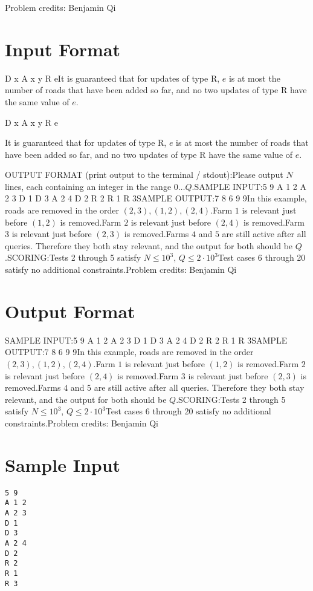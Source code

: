 \documentclass[12pt]{article}
\begin{document}
Problem credits: Benjamin Qi



\section*{Input Format}
D x
A x y
R eIt is guaranteed that for updates of type R, $e$ is at most the number of roads
that have been added so far, and no two updates of type R have the same value of
$e$.

D x
A x y
R e

It is guaranteed that for updates of type R, $e$ is at most the number of roads
that have been added so far, and no two updates of type R have the same value of
$e$.

OUTPUT FORMAT (print output to the terminal / stdout):Please output $N$ lines, each containing an integer in the range $0\ldots Q$.SAMPLE INPUT:5 9
A 1 2
A 2 3
D 1
D 3
A 2 4
D 2
R 2
R 1
R 3SAMPLE OUTPUT:7
8
6
9
9In this example, roads are removed in the order $(2,3), (1,2), (2,4)$.Farm $1$ is relevant just before $(1,2)$ is removed.Farm $2$ is relevant just before $(2,4)$ is removed.Farm $3$ is relevant just before $(2,3)$ is removed.Farms $4$ and $5$ are still active after all queries. Therefore they both
stay relevant, and the output for both should be $Q$.SCORING:Tests 2 through 5 satisfy $N\le 10^3$, $Q\le 2\cdot 10^3$Test cases 6 through 20 satisfy no additional constraints.Problem credits: Benjamin Qi

\section*{Output Format}
SAMPLE INPUT:5 9
A 1 2
A 2 3
D 1
D 3
A 2 4
D 2
R 2
R 1
R 3SAMPLE OUTPUT:7
8
6
9
9In this example, roads are removed in the order $(2,3), (1,2), (2,4)$.Farm $1$ is relevant just before $(1,2)$ is removed.Farm $2$ is relevant just before $(2,4)$ is removed.Farm $3$ is relevant just before $(2,3)$ is removed.Farms $4$ and $5$ are still active after all queries. Therefore they both
stay relevant, and the output for both should be $Q$.SCORING:Tests 2 through 5 satisfy $N\le 10^3$, $Q\le 2\cdot 10^3$Test cases 6 through 20 satisfy no additional constraints.Problem credits: Benjamin Qi

\section*{Sample Input}
\begin{verbatim}
5 9
A 1 2
A 2 3
D 1
D 3
A 2 4
D 2
R 2
R 1
R 3
\end{verbatim}
\end{document}

